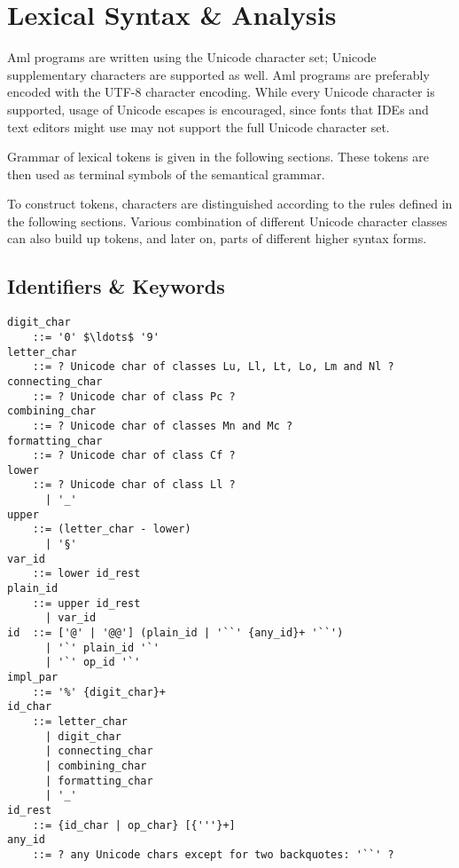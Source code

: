 
\newcommand{\Unicode}[1]{\mbox{$\backslash$u{#1}}}
\newcommand{\UnicodeRange}[2]{\mbox{$\backslash$u{#1}-$\backslash$u{#2}}}

\chapter{Lexical Syntax \& Analysis}
\label{sec:lexical-analysis}

\minitoc

Aml programs are written using the Unicode character set; Unicode supplementary characters are supported as well. Aml programs are preferably encoded with the UTF-8 character encoding. While every Unicode character is supported, usage of Unicode escapes is encouraged, since fonts that IDEs and text editors might use may not support the full Unicode character set.

Grammar of lexical tokens is given in the following sections. These tokens are then used as terminal symbols of the semantical grammar. 

To construct tokens, characters are distinguished according to the rules defined in the following sections. Various combination of different Unicode character classes can also build up tokens, and later on, parts of different higher syntax forms. 


\newpage






\section{Identifiers \& Keywords}
\label{sec:identifiers}
\label{sec:keywords}

\syntax\begin{lstlisting}[deletekeywords={of,and,class,for}]
digit_char 
    ::= '0' $\ldots$ '9'
letter_char
    ::= ? Unicode char of classes Lu, Ll, Lt, Lo, Lm and Nl ?
connecting_char 
    ::= ? Unicode char of class Pc ?
combining_char
    ::= ? Unicode char of classes Mn and Mc ?
formatting_char 
    ::= ? Unicode char of class Cf ?
lower 
    ::= ? Unicode char of class Ll ? 
      | '_'
upper 
    ::= (letter_char - lower) 
      | '§'
var_id 
    ::= lower id_rest
plain_id 
    ::= upper id_rest
      | var_id
id  ::= ['@' | '@@'] (plain_id | '``' {any_id}+ '``')
      | '`' plain_id '`'
      | '`' op_id '`'
impl_par 
    ::= '%' {digit_char}+
id_char 
    ::= letter_char
      | digit_char
      | connecting_char
      | combining_char
      | formatting_char
      | '_'
id_rest 
    ::= {id_char | op_char} [{'''}+]
any_id 
    ::= ? any Unicode chars except for two backquotes: '``' ?
\end{lstlisting}


